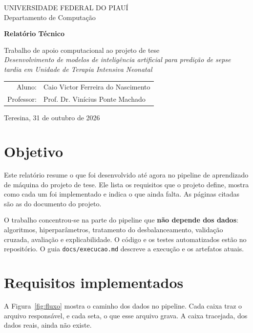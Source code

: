 \documentclass[11pt,a4paper]{article}
\newcommand{\cod}[1]{\texttt{#1}}
\begin{document}
\begin{titlepage}
\centering
{\large UNIVERSIDADE FEDERAL DO PIAUÍ\\Departamento de Computação\par}
\vspace{4cm}
{\LARGE\bfseries\color{azul} Relatório Técnico\par}
\vspace{0.8cm}
{\large Trabalho de apoio computacional ao projeto de tese\\[0.3cm]
\emph{Desenvolvimento de modelos de inteligência artificial para predição de sepse tardia em Unidade de Terapia
Intensiva Neonatal}\par}
\vspace{2.5cm}
\begin{tabular}{rl}
Aluno: & Caio Victor Ferreira do Nascimento\\
Professor: & Prof. Dr. Vinícius Ponte Machado\\
\end{tabular}
\vfill
{\large Teresina, 31 de outubro de 2026\par}
\end{titlepage}

\section{Objetivo}

Este relatório resume o que foi desenvolvido até agora no pipeline de aprendizado de máquina do projeto de tese. Ele
lista os requisitos que o projeto define, mostra como cada um foi implementado e indica o que ainda falta. As páginas
citadas são as do documento do projeto.

O trabalho concentrou-se na parte do pipeline que \textbf{não depende dos dados}: algoritmos, hiperparâmetros,
tratamento do desbalanceamento, validação cruzada, avaliação e explicabilidade. O código e os testes automatizados estão no repositório. O guia \cod{docs/execucao.md} descreve a execução e os artefatos atuais.

\section{Requisitos implementados}

A Figura~\ref{fig:fluxo} mostra o caminho dos dados no pipeline. Cada caixa traz o arquivo responsável, e cada seta, o
que esse arquivo grava. A caixa tracejada, dos dados reais, ainda não existe.
\end{document}
